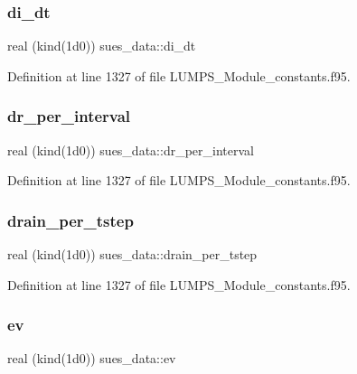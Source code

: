 \subsubsection{\texorpdfstring{di\+\_\+dt}{di\_dt}}
{\footnotesize\ttfamily real (kind(1d0)) sues\+\_\+data\+::di\+\_\+dt}



Definition at line 1327 of file L\+U\+M\+P\+S\+\_\+\+Module\+\_\+constants.\+f95.

\mbox{\label{namespacesues__data_aad693b9bca68a54522874f01bd0f2a18}} 
\subsubsection{\texorpdfstring{dr\+\_\+per\+\_\+interval}{dr\_per\_interval}}
{\footnotesize\ttfamily real (kind(1d0)) sues\+\_\+data\+::dr\+\_\+per\+\_\+interval}



Definition at line 1327 of file L\+U\+M\+P\+S\+\_\+\+Module\+\_\+constants.\+f95.

\mbox{\label{namespacesues__data_a96e76d9edd6c97fcdbc8f73047e189f3}} 
\subsubsection{\texorpdfstring{drain\+\_\+per\+\_\+tstep}{drain\_per\_tstep}}
{\footnotesize\ttfamily real (kind(1d0)) sues\+\_\+data\+::drain\+\_\+per\+\_\+tstep}



Definition at line 1327 of file L\+U\+M\+P\+S\+\_\+\+Module\+\_\+constants.\+f95.

\mbox{\label{namespacesues__data_a879c9f9f7cf8597fe30edea62a95bcdd}} 
\subsubsection{\texorpdfstring{ev}{ev}}
{\footnotesize\ttfamily real (kind(1d0)) sues\+\_\+data\+::ev}



